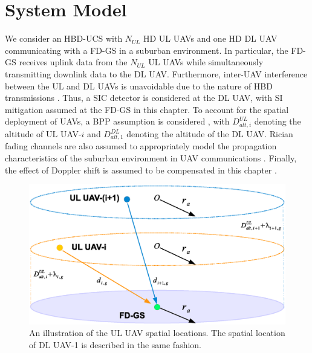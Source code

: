 \section{System Model} \label{HBD_multi_UAV_sec_sys_model}

We consider an HBD-UCS with $N_{UL}$ HD UL UAVs and one HD DL UAV communicating with a FD-GS in a suburban environment. In particular, the FD-GS receives uplink data from the $N_{UL}$ UL UAVs while simultaneously transmitting downlink data to the DL UAV. Furthermore, inter-UAV interference between the UL and DL UAVs is unavoidable due to the nature of HBD transmissions \cite{tan2018joint,ernest2019outage}. Thus, a SIC detector is considered at the DL UAV, with SI mitigation assumed at the FD-GS in this chapter. To account for the spatial deployment of UAVs, a BPP assumption is considered \cite{chetlur2017downlink, wang2018modeling}, with $D_{alt,i}^{UL}$ denoting the altitude of UL UAV-$i$ and $D_{alt,1}^{DL}$ denoting the altitude of the DL UAV. Rician fading channels are also assumed to appropriately model the propagation characteristics of the suburban environment in UAV communications \cite{matolak2017air_suburban}. Finally, the effect of Doppler shift is assumed to be compensated in this chapter \cite{tan2018joint,ernest2019outage}.


\begin{figure} []
\centering
\vspace{-2cm}
\includegraphics [width=0.6\columnwidth]{chap6_fig/UL_UAV_deployment.eps} 
\caption{An illustration of the UL UAV spatial locations. The spatial location of DL UAV-1 is described in the same fashion.}
\label{fig:HBD_multi_UAV_UL_UAV_deployment}
\end{figure}


